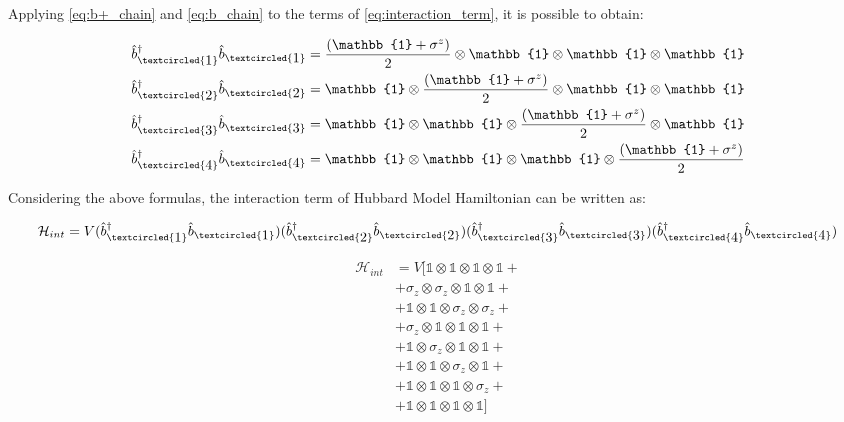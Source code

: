 \documentclass[twoside,twocolumn]{article}
\begin{document}
Applying \ref{eq:b+_chain} and \ref{eq:b_chain} to the terms of \ref{eq:interaction_term},
it is possible to obtain:

\begin{equation}
\begin{aligned}
\hat{b}^\dagger_{\textcircled{\raisebox{-0.9pt}{1}}}\hat{b}_{\textcircled{\raisebox{-0.9pt}{1}}} &=
  \frac{(\mathbb{1}+\sigma^z)}{2} \otimes \mathbb{1} \otimes \mathbb{1} \otimes \mathbb{1}\\
\hat{b}^\dagger_{\textcircled{\raisebox{-0.9pt}{2}}}\hat{b}_{\textcircled{\raisebox{-0.9pt}{2}}} &=
  \mathbb{1} \otimes \frac{(\mathbb{1}+\sigma^z)}{2} \otimes \mathbb{1} \otimes \mathbb{1}\\
\hat{b}^\dagger_{\textcircled{\raisebox{-0.9pt}{3}}}\hat{b}_{\textcircled{\raisebox{-0.9pt}{3}}} &=
  \mathbb{1} \otimes \mathbb{1} \otimes \frac{(\mathbb{1}+\sigma^z)}{2} \otimes \mathbb{1}\\
\hat{b}^\dagger_{\textcircled{\raisebox{-0.9pt}{4}}}\hat{b}_{\textcircled{\raisebox{-0.9pt}{4}}} &=
  \mathbb{1} \otimes \mathbb{1} \otimes \mathbb{1} \otimes \frac{(\mathbb{1}+\sigma^z)}{2}\\
\end{aligned}
\end{equation}

Considering the above formulas, the interaction term of Hubbard Model Hamiltonian can be written as:

$$
\mathcal{H}_{int} = V
  (\hat{b}^\dagger_{\textcircled{\raisebox{-0.9pt}{1}}}\hat{b}_{\textcircled{\raisebox{-0.9pt}{1}}})
  (\hat{b}^\dagger_{\textcircled{\raisebox{-0.9pt}{2}}}\hat{b}_{\textcircled{\raisebox{-0.9pt}{2}}}) (\hat{b}^\dagger_{\textcircled{\raisebox{-0.9pt}{3}}}\hat{b}_{\textcircled{\raisebox{-0.9pt}{3}}})
  (\hat{b}^\dagger_{\textcircled{\raisebox{-0.9pt}{4}}}\hat{b}_{\textcircled{\raisebox{-0.9pt}{4}}})
$$

\begin{equation}\label{eq:interaction_solution}
\begin{aligned}
\mathcal{H}_{int} &= V [ \mathbb{1} \otimes \mathbb{1} \otimes \mathbb{1} \otimes \mathbb{1} +\\
  &+ \sigma_z \otimes \sigma_z \otimes \mathbb{1} \otimes \mathbb{1} +\\
  &+ \mathbb{1} \otimes \mathbb{1} \otimes \sigma_z \otimes \sigma_z +\\
  &+ \sigma_z \otimes \mathbb{1} \otimes \mathbb{1} \otimes \mathbb{1} +\\
  &+ \mathbb{1} \otimes \sigma_z \otimes \mathbb{1} \otimes \mathbb{1} +\\
  &+ \mathbb{1} \otimes \mathbb{1} \otimes \sigma_z \otimes \mathbb{1} +\\
  &+ \mathbb{1} \otimes \mathbb{1} \otimes \mathbb{1} \otimes \sigma_z +\\
  &+ \mathbb{1} \otimes \mathbb{1} \otimes \mathbb{1} \otimes \mathbb{1} ]\\
\end{aligned}
\end{equation}
\end{document}
